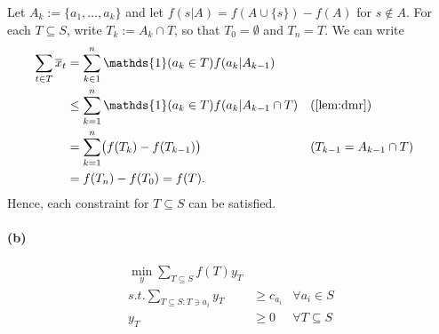 \documentclass[11pt,letterpaper]{article}
\theoremstyle{definition}
\newcommand{\One}{\mathds{1}}
\begin{document}
Let $A_k:= \{a_1,\dots,a_k\}$ and let $f(s|A) = f(A\cup\{s\}) - f(A)$ for $s\notin A$.
For each $T\subseteq S$, write $T_k := A_k\cap T$, so that $T_0=\emptyset$ and $T_n=T$. We can write
\begin{align*}
    \sum_{t\in T}\overline{x}_t &= \sum_{k\in 1}^n \One(a_k\in T) f(a_k|A_{k-1})\\
    &\leq \sum_{k= 1}^n \One(a_k\in T) f(a_k|A_{k-1}\cap T) && (\Cref{lem:dmr})\\
    &= \sum_{k=1}^n \bigl(f(T_k) - f(T_{k-1})\bigr) && (T_{k-1}=A_{k-1}\cap T)\\
    &= f(T_n) - f(T_0) = f(T).  
\end{align*}
Hence, each constraint for $T\subseteq S$ can be satisfied.

\paragraph{(b)}
\begin{align*}
    \min_{y} \sum_{T\subseteq S} f(T)y_T \\
    s.t. \sum_{T\subseteq S: T\ni a_i} y_T &\geq c_{a_i} &\forall a_i\in S \\
    y_T&\geq 0 & \forall T\subseteq S
\end{align*}
\end{document}

